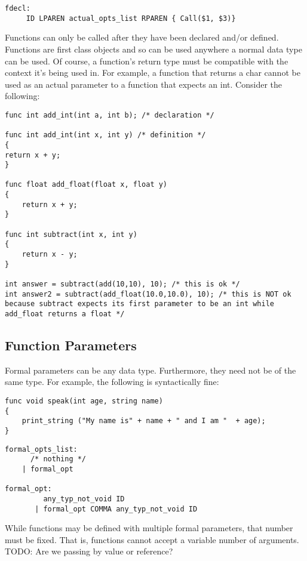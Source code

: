 \documentclass{article}
\begin{document}
\begin{Verbatim}[frame=single]
fdecl:
	 ID LPAREN actual_opts_list RPAREN { Call($1, $3)}
\end{Verbatim}

Functions can only be called after they have been declared and/or defined. Functions are first class objects and so can be used anywhere a normal data type can be used. Of course, a function's return type must be compatible with the context it's being used in. For example, a function that returns a char cannot be used as an actual parameter to a function that expects an int.  Consider the following:

\begin{lstlisting}
func int add_int(int a, int b); /* declaration */

func int add_int(int x, int y) /* definition */
{
return x + y;
}

func float add_float(float x, float y)
{
	return x + y;
}

func int subtract(int x, int y)
{
	return x - y;
}

int answer = subtract(add(10,10), 10); /* this is ok */
int answer2 = subtract(add_float(10.0,10.0), 10); /* this is NOT ok because subtract expects its first parameter to be an int while add_float returns a float */

\end{lstlisting}

\subsection{Function Parameters}
Formal parameters can be any data type. Furthermore, they need not be of the same type. For example, the following is syntactically fine:

\begin{lstlisting}
func void speak(int age, string name)
{
	print_string ("My name is" + name + " and I am "  + age);
}
\end{lstlisting}


\begin{Verbatim}[frame=single]
formal_opts_list:
	  /* nothing */ 
	| formal_opt 

formal_opt:
	     any_typ_not_void ID 		
	   | formal_opt COMMA any_typ_not_void ID 	
\end{Verbatim}


While functions may be defined with multiple formal parameters, that number must be fixed. That is, functions cannot accept a variable number of arguments. 
\\
TODO: Are we passing by value or reference?
\end{document}
